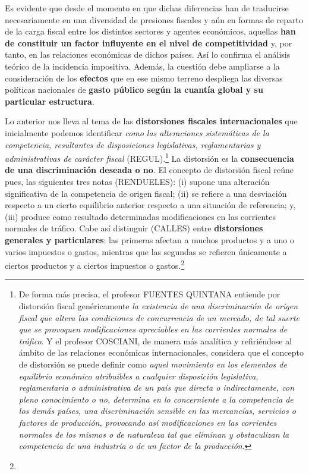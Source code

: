 \documentclass[10pt,a4paper]{article}
\begin{document}
Es evidente que desde el momento en que dichas diferencias han de traducirse necesariamente en una diversidad de presiones fiscales y aún en formas de reparto de la carga fiscal entre los distintos sectores y agentes económicos, aquellas \textbf{han de constituir un factor influyente en el nivel de competitividad} y, por tanto, en las relaciones económicas de dichos países. Así lo confirma el análisis teórico de la incidencia impositiva. Además, la cuestión debe ampliarse a la consideración de los \textbf{efectos} que en ese mismo terreno despliega las diversas políticas nacionales de \textbf{gasto público según la cuantía global y su particular estructura}.

Lo anterior nos lleva al tema de las \textbf{distorsiones fiscales internacionales} que inicialmente podemos identificar \textit{como las alteraciones sistemáticas de la competencia, resultantes de disposiciones legislativas, reglamentarias y administrativas de carácter fiscal} (REGUL).\footnote{%
    De forma más precisa, el profesor FUENTES QUINTANA entiende por distorsión fiscal genéricamente \textit{la existencia de una discriminación de origen fiscal que altera las condiciones de concurrencia de un mercado, de tal suerte que se provoquen modificaciones apreciables en las corrientes normales de tráfico}. Y el profesor COSCIANI, de manera más analítica y refiriéndose al ámbito de las relaciones económicas internacionales, considera que el concepto de distorsión se puede definir como \textit{aquel movimiento en los elementos de equilibrio económico atribuibles a cualquier disposición legislativa, reglamentaria o administrativa de un país que directa o indirectamente, con pleno conocimiento o no, determina en lo concerniente a la competencia de los demás países, una discriminación sensible en las mercancías, servicios o factores de producción, provocando así modificaciones en las corrientes normales de los mismos o de naturaleza tal que eliminan y obstaculizan la competencia de una industria o de un factor de la producción}.
} La distorsión es la \textbf{consecuencia de una discriminación deseada o no}. El concepto de distorsión fiscal reúne pues, las siguientes tres notas (RENDUELES): (i) supone una alteración significativa de la competencia de origen fiscal; (ii) se refiere a una desviación respecto a un cierto equilibrio anterior respecto a una situación de referencia; y, (iii) produce como resultado determinadas modificaciones en las corrientes normales de tráfico. Cabe así distinguir (CALLES) entre \textbf{distorsiones generales y particulares}: las primeras afectan a muchos productos y a uno o varios impuestos o gastos, mientras que las segundas se refieren únicamente a ciertos productos y a ciertos impuestos o gastos.\footnote{%
}
\end{document}
